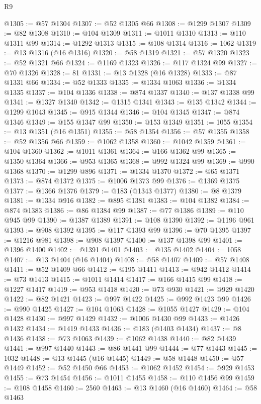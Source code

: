 \begin{lexlean}{R9}
\begin{coremodule}
@1305 := @57 @1304
@1307 := @52 @1305 @66
@1308 := @1299 @1307
@1309 := @82 @1308
@1310 := @104 @1309
@1311 := @1011 @1310
@1313 := @110 @1311 @99
@1314 := @1292 @1313
@1315 := @108 @1314
@1316 := 1062
@1319 := @13 @1316 (@16 @1316)
@1320 := @58 @1319
@1321 := @57 @1320
@1323 := @52 @1321 @66
@1324 := @1169 @1323
@1326 := @117 @1324 @99
@1327 := @70 @1326
@1328 := 81
@1331 := @13 @1328 (@16 @1328)
@1333 := @87 @1331 @66
@1334 := @52 @1333
@1335 := @1334 @1063
@1336 := @1334 @1335
@1337 := @104 @1336
@1338 := @874 @1337
@1340 := @137 @1338 @99
@1341 := @1327 @1340
@1342 := @1315 @1341
@1343 := @135 @1342
@1344 := @1299 @1043
@1345 := @915 @1344
@1346 := @104 @1345
@1347 := @874 @1346
@1349 := @155 @1347 @99
@1350 := @153 @1349
@1351 := 1055
@1354 := @13 @1351 (@16 @1351)
@1355 := @58 @1354
@1356 := @57 @1355
@1358 := @52 @1356 @66
@1359 := @1062 @1358
@1360 := @1042 @1359
@1361 := @104 @1360
@1362 := @1011 @1361
@1364 := @166 @1362 @99
@1365 := @1350 @1364
@1366 := @953 @1365
@1368 := @992 @1324 @99
@1369 := @990 @1368
@1370 := @1299 @896
@1371 := @1334 @1370
@1372 := @65 @1371
@1373 := @874 @1372
@1375 := @1006 @1373 @99
@1376 := @1369 @1375
@1377 := @1366 @1376
@1379 := @183 (@1343 @1377)
@1380 := @8 @1379
@1381 := @1334 @916
@1382 := @895 @1381
@1383 := @104 @1382
@1384 := @874 @1383
@1386 := @86 @1384 @99
@1387 := @77 @1386
@1389 := @110 @945 @99
@1390 := @1387 @1389
@1391 := @108 @1390
@1392 := @1196 @961
@1393 := @908 @1392
@1395 := @117 @1393 @99
@1396 := @70 @1395
@1397 := @1216 @981
@1398 := @908 @1397
@1400 := @137 @1398 @99
@1401 := @1396 @1400
@1402 := @1391 @1401
@1403 := @135 @1402
@1404 := 1058
@1407 := @13 @1404 (@16 @1404)
@1408 := @58 @1407
@1409 := @57 @1408
@1411 := @52 @1409 @66
@1412 := @195 @1411
@1413 := @942 @1412
@1414 := @73 @1413
@1415 := @1011 @1414
@1417 := @166 @1415 @99
@1418 := @1227 @1417
@1419 := @953 @1418
@1420 := @73 @930
@1421 := @929 @1420
@1422 := @82 @1421
@1423 := @997 @1422
@1425 := @992 @1423 @99
@1426 := @990 @1425
@1427 := @104 @1063
@1428 := @1055 @1427
@1429 := @104 @1428
@1430 := @997 @1429
@1432 := @1006 @1430 @99
@1433 := @1426 @1432
@1434 := @1419 @1433
@1436 := @183 (@1403 @1434)
@1437 := @8 @1436
@1438 := @73 @1063
@1439 := @1062 @1438
@1440 := @82 @1439
@1441 := @997 @1440
@1443 := @86 @1441 @99
@1444 := @77 @1443
@1445 := 1032
@1448 := @13 @1445 (@16 @1445)
@1449 := @58 @1448
@1450 := @57 @1449
@1452 := @52 @1450 @66
@1453 := @1062 @1452
@1454 := @929 @1453
@1455 := @73 @1454
@1456 := @1011 @1455
@1458 := @110 @1456 @99
@1459 := @108 @1458
@1460 := 2560
@1463 := @13 @1460 (@16 @1460)
@1464 := @58 @1463

\end{coremodule}
\end{lexlean}
